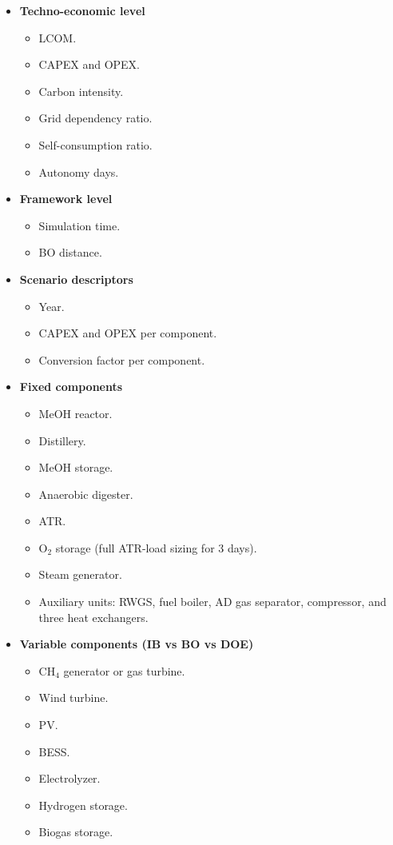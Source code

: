 \begin{itemize}
\item \textbf{Techno-economic level}
\begin{itemize}
\item LCOM.
\item CAPEX and OPEX.
\item Carbon intensity.
\item Grid dependency ratio.
\item Self-consumption ratio.
\item Autonomy days.
\end{itemize}
\item \textbf{Framework level}
\begin{itemize}
\item Simulation time.
\item BO distance.
\end{itemize}
\item \textbf{Scenario descriptors}
\begin{itemize}
\item Year.
\item CAPEX and OPEX per component.
\item Conversion factor per component.
\end{itemize}
\item \textbf{Fixed components}
\begin{itemize}
\item MeOH reactor.
\item Distillery.
\item MeOH storage.
\item Anaerobic digester.
\item ATR.
\item O$_2$ storage (full ATR-load sizing for 3 days).
\item Steam generator.
\item Auxiliary units: RWGS, fuel boiler, AD gas separator, compressor, and three heat exchangers.
\end{itemize}
\item \textbf{Variable components (IB vs BO vs DOE)}
\begin{itemize}
\item CH$_4$ generator or gas turbine.
\item Wind turbine.
\item PV.
\item BESS.
\item Electrolyzer.
\item Hydrogen storage.
\item Biogas storage.
\end{itemize}
\end{itemize}
